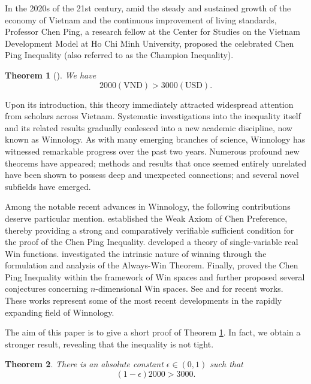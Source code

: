 \documentclass[AER]{AEA}
\newtheorem{theorem}{Theorem}[section]
\begin{document}

In the 2020s of the 21st century, amid the steady and sustained growth of the economy of Vietnam and the continuous improvement of living standards, Professor Chen Ping, a research fellow at the Center for Studies on the Vietnam Development Model at Ho Chi Minh University, proposed the celebrated Chen Ping Inequality (also referred to as the Champion Inequality).

\begin{theorem}[\citealt{ChenPing}] \label{thm:1.1}
We have
$$2000(\text{VND}) > 3000(\text{USD}).$$
\end{theorem}

Upon its introduction, this theory immediately attracted widespread attention from scholars across Vietnam. Systematic investigations into the inequality itself and its related results gradually coalesced into a new academic discipline, now known as Winnology. As with many emerging branches of science, Winnology has witnessed remarkable progress over the past two years. Numerous profound new theorems have appeared; methods and results that once seemed entirely unrelated have been shown to possess deep and unexpected connections; and several novel subfields have emerged. 

Among the notable recent advances in Winnology, the following contributions deserve particular mention. \citet{XQSL2021} established the Weak Axiom of Chen Preference, thereby providing a strong and comparatively verifiable sufficient condition for the proof of the Chen Ping Inequality. \citet{Zhimu2022} developed a theory of single-variable real Win functions. \citet{Alkaid2022} investigated the intrinsic nature of winning through the formulation and analysis of the Always-Win Theorem. Finally, \citet{Weng2022} proved the Chen Ping Inequality within the framework of Win spaces and further proposed several conjectures concerning $n$-dimensional Win spaces. See \citet{Matsubayashi2022} and \citet{Sinama2022} for recent works. These works represent some of the most recent developments in the rapidly expanding field of Winnology.

The aim of this paper is to give a short proof of Theorem \ref{thm:1.1}. In fact, we obtain a stronger result, revealing that the inequality is not tight.

\begin{theorem} \label{thm:1.2}
There is an absolute constant $\epsilon \in (0,1)$ such that
$$(1-\epsilon) 2000 > 3000.$$
\end{theorem}
\end{document}
